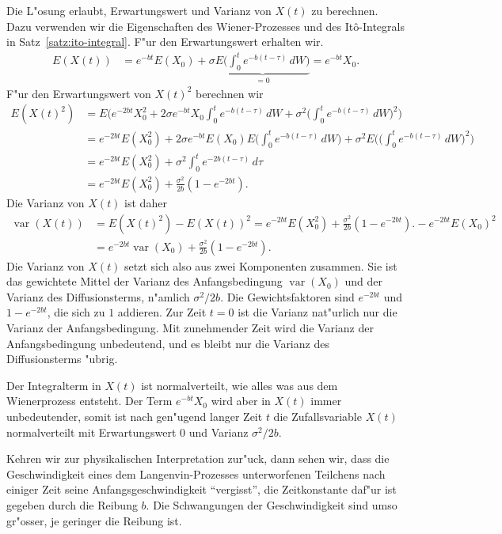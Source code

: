 Die L"osung erlaubt, Erwartungswert und Varianz von $X(t)$ zu berechnen.
Dazu verwenden wir die Eigenschaften des Wiener-Prozesses und des
It\^o-Integrals in Satz~\ref{satz:ito-integral}.
F"ur den Erwartungswert erhalten wir.
\begin{align*}
E(X(t))
&=
e^{-bt}E(X_0)
+
\sigma \underbrace{E\biggl(\int_0^t e^{-b(t-\tau)}\,dW\biggr)}_{\textstyle=0}
=
e^{-bt}X_0.
\end{align*}
F"ur den Erwartungswert von $X(t)^2$ berechnen wir
\begin{align*}
E(X(t)^2)
&=
E\biggl(e^{-2bt}X_0^2+2\sigma e^{-bt}X_0\int_0^te^{-b(t-\tau)}\,dW
+\sigma^2\biggl(\int_0^t e^{-b(t-\tau)}\,dW\biggr)^2
\biggr)
\\
&=
e^{-2bt}E(X_0^2)
+
2\sigma e^{-bt}E(X_0)E\biggl( \int_0^te^{-b(t-\tau)}\,dW\biggr)
+
\sigma^2E\biggl(\biggl(\int_0^t e^{-b(t-\tau)}\,dW\biggr)^2\biggr)
\\
&=
e^{-2bt}E(X_0^2)
+
\sigma^2 \int_0^t e^{-2b(t-\tau)}\,d\tau
\\
&=
e^{-2bt}E(X_0^2)
+
\frac{\sigma^2}{2b}(1-e^{-2bt}).
\end{align*}
Die Varianz von $X(t)$ ist daher
\begin{align*}
\operatorname{var}(X(t))
&=
E(X(t)^2)-E(X(t))^2
=
e^{-2bt}E(X_0^2)
+
\frac{\sigma^2}{2b}(1-e^{-2bt}).
-
e^{-2bt}E(X_0)^2
\\
&=
e^{-2bt}\operatorname{var}(X_0)
+
\frac{\sigma^2}{2b}(1-e^{-2bt}).
\end{align*}
Die Varianz von $X(t)$ setzt sich also aus zwei Komponenten zusammen.
Sie ist das gewichtete Mittel der Varianz des Anfangsbedingung
$\operatorname{var}(X_0)$ und der Varianz des Diffusionsterms, n"amlich
$\sigma^2/2b$.
Die Gewichtsfaktoren sind $e^{-2bt}$ und $1-e^{-2bt}$, die sich zu
$1$ addieren.
Zur Zeit $t=0$ ist die Varianz nat"urlich nur die Varianz der Anfangsbedingung.
Mit zunehmender Zeit wird die Varianz der Anfangsbedingung unbedeutend,
und es bleibt nur die Varianz des Diffusionsterms "ubrig.

Der Integralterm in $X(t)$ ist normalverteilt, wie alles was aus dem
Wienerprozess entsteht.
Der Term $e^{-bt}X_0$ wird aber in $X(t)$ immer unbedeutender, somit ist
nach gen"ugend langer Zeit $t$ die Zufallsvariable $X(t)$ normalverteilt
mit Erwartungswert $0$ und Varianz $\sigma^2/2b$.

Kehren wir zur physikalischen Interpretation zur"uck, dann sehen wir,
dass die Geschwindigkeit eines dem Langenvin-Prozesses unterworfenen
Teilchens nach einiger Zeit seine Anfangsgeschwindigkeit ``vergisst'',
die Zeitkonstante daf"ur ist gegeben durch die Reibung $b$.
Die Schwangungen der Geschwindigkeit sind umso gr"osser, je geringer
die Reibung ist.

